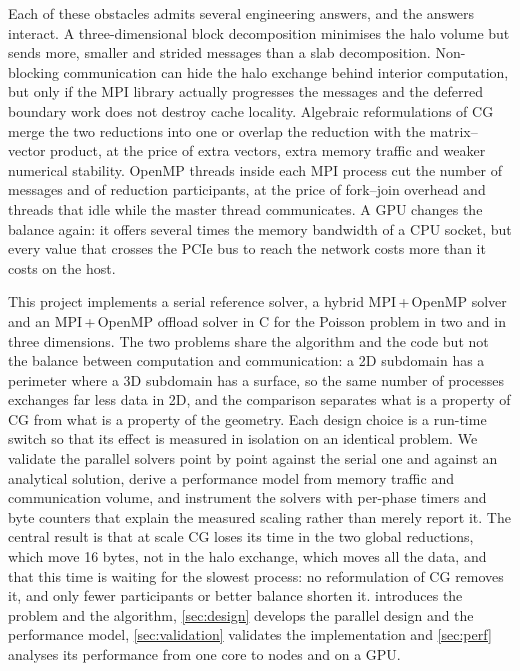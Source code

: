 \documentclass[10pt,a4paper]{article}
\begin{document}
Each of these obstacles admits several engineering answers, and the answers interact. A
three-dimensional block decomposition minimises the halo volume but sends more, smaller and strided
messages than a slab decomposition. Non-blocking communication can hide the halo exchange behind interior
computation, but only if the MPI library actually progresses the messages and the deferred boundary work
does not destroy cache locality. Algebraic reformulations of CG merge the two reductions into one or
overlap the reduction with the matrix--vector product, at the price of extra vectors, extra memory
traffic and weaker numerical stability. OpenMP threads inside each MPI process cut the number of messages
and of reduction participants, at the price of fork--join overhead and threads that idle while the master
thread communicates. A GPU changes the balance again: it offers several times the memory bandwidth of a
CPU socket, but every value that crosses the PCIe bus to reach the network costs more than it costs on the
host.

This project implements a serial reference solver, a hybrid MPI\,+\,OpenMP solver and an MPI\,+\,OpenMP
offload solver in C for the Poisson problem in two and in three dimensions. The two problems share the
algorithm and the code but not the balance between computation and communication: a 2D subdomain has a
perimeter where a 3D subdomain has a surface, so the same number of processes exchanges far less data in
2D, and the comparison separates what is a property of CG from what is a property of the geometry. Each
design choice is a run-time switch so that its effect is measured in isolation
on an identical problem. We validate the parallel solvers point by point against the serial one and against
an analytical solution, derive a performance model from memory traffic and communication volume, and
instrument the solvers with per-phase timers and byte counters that explain the measured scaling rather
than merely report it. The central result is that at scale CG loses its time in the two global reductions,
which move 16 bytes, not in the halo exchange, which moves all the data, and that this time is waiting for
the slowest process: no reformulation of CG removes it, and only fewer participants or better balance
shorten it.  introduces the problem and the algorithm, \cref{sec:design}
develops the parallel design and the performance model, \cref{sec:validation} validates the
implementation and \cref{sec:perf} analyses its performance from one core to \NodesMax{} nodes and on a
GPU.
\end{document}
